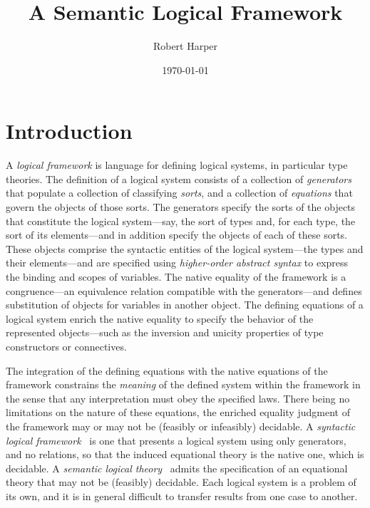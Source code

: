 \documentclass[11pt,twoside]{article}
\begin{document}
\title{A Semantic Logical Framework}
\author{Robert Harper}
\date{\today}

\maketitle{}

\section{Introduction}

A \emph{logical framework} is language for defining logical systems, in particular type
theories.  The definition of a logical system consists of a collection of
\emph{generators} that populate a collection of classifying \emph{sorts}, and a collection
of \emph{equations} that govern the objects of those sorts.  The generators specify the
sorts of the objects that constitute the logical system---say, the sort of types and, for
each type, the sort of its elements---and in addition specify the objects of each of these
sorts.  These objects comprise the syntactic entities of the logical system---the types and
their elements---and are specified using \emph{higher-order abstract syntax} to express the
binding and scopes of variables.  The native equality of the framework is a congruence---an
equivalence relation compatible with the generators---and defines substitution of objects
for variables in another object.  The defining equations of a logical system enrich the
native equality to specify the behavior of the represented objects---such as the inversion
and unicity properties of type constructors or connectives.

The integration of the defining equations with the native equations of the framework
constrains the \emph{meaning} of the defined system within the framework in the sense that
any interpretation must obey the specified laws.  There being no limitations on the nature
of these equations, the enriched equality judgment of the framework may or may not be
(feasibly or infeasibly) decidable.  A \emph{syntactic logical
  framework}~\cite{harper-etal:lf} is one that presents a logical system using only
generators, and no relations, so that the induced equational theory is the native one,
which is decidable.  A \emph{semantic logical theory}~\cite{smith1990programming} admits
the specification of an equational theory that may not be (feasibly) decidable.  Each
logical system is a problem of its own, and it is in general difficult to transfer results
from one case to another.
\end{document}
